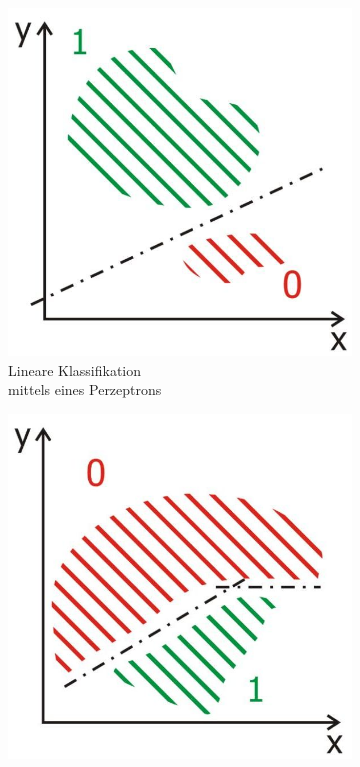 \begin{figure}[h]
	\captionsetup[subfigure]{position=b}
	\centering
	\begin{subfigure}[b]{0.3\textwidth}
		\centering
		\includegraphics[width=\textwidth]{kapitel3/images/linear_classification.jpg}
		\caption{Lineare \hspace{-0.16cm} Klassifikation \\ mittels eines Perzeptrons}
		\label{linear-classification}
	\end{subfigure}
	\hspace{1em}
	\begin{subfigure}[b]{0.3\textwidth}
		\centering
		\includegraphics[width=\textwidth]{kapitel3/images/non_linear_classification.jpg}

\end{subfigure}
\end{figure}
